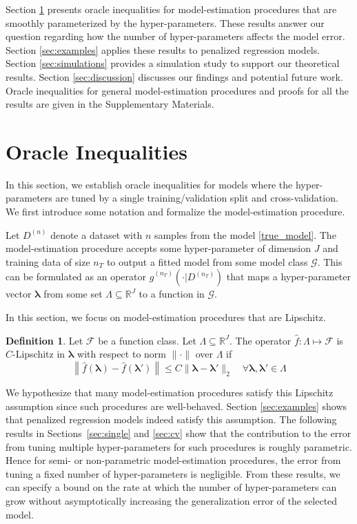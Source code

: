 \documentclass[12pt]{article} %
\theoremstyle{definition}
\newtheorem{definition}{Definition}
\begin{document}
Section \ref{sec:main_results} presents oracle inequalities for model-estimation procedures that are smoothly parameterized by the hyper-parameters. These results answer our question regarding how the number of hyper-parameters affects the model error.
Section \ref{sec:examples} applies these results to penalized regression models.
Section \ref{sec:simulations} provides a simulation study to support our theoretical results.
Section \ref{sec:discussion} discusses our findings and potential future work.
Oracle inequalities for general model-estimation procedures and proofs for all the results are given in the Supplementary Materials.



\section{Oracle Inequalities} \label{sec:main_results}

In this section, we establish oracle inequalities for models where the hyper-parameters are tuned by a single training/validation split and cross-validation. We first introduce some notation and formalize the model-estimation procedure. 

Let $D^{(n)}$ denote a dataset with $n$ samples from the model \eqref{true_model}. The model-estimation procedure accepts some hyper-parameter of dimension $J$ and training data of size $n_T$ to output a fitted model from some model class $\mathcal{G}$. This can be formulated as an operator $\hat{g}^{(n_T)}(\cdot | D^{(n_T)})$ that maps a hyper-parameter vector $\boldsymbol{\lambda}$ from some set $\Lambda \subseteq \mathbb{R}^J$ to a function in $\mathcal{G}$. 

In this section, we focus on model-estimation procedures that are Lipschitz.
\begin{definition}
	\label{def:smooth_funcs}
	Let $\mathcal{F}$ be a function class. Let $\Lambda \subseteq \mathbb{R}^J$.
	The operator $\hat{f}: \Lambda \mapsto \mathcal{F}$ is $C$-Lipschitz in $\boldsymbol{\lambda}$ with respect to norm $\| \cdot \|$ over $\Lambda$ if
	\begin{equation}
	\left \| \hat{f}(\boldsymbol \lambda) - \hat{f}(\boldsymbol \lambda ') \right \|
	\le
	C \| \boldsymbol \lambda - \boldsymbol \lambda' \|_2 
	\quad
	\forall \boldsymbol \lambda,\boldsymbol \lambda' \in \Lambda
	\label{eq:smooth_funcs}
	\end{equation}
\end{definition}
We hypothesize that many model-estimation procedures satisfy this Lipschitz assumption since such procedures are well-behaved. Section \ref{sec:examples} shows that penalized regression models indeed satisfy this assumption. The following results in Sections~\ref{sec:single} and \ref{sec:cv} show that the contribution to the error from tuning multiple hyper-parameters for such procedures is roughly parametric. Hence for semi- or non-parametric model-estimation procedures, the error from tuning a fixed number of hyper-parameters is negligible. From these results, we can specify a bound on the rate at which the number of hyper-parameters can grow without asymptotically increasing the generalization error of the selected model.
\end{document}
